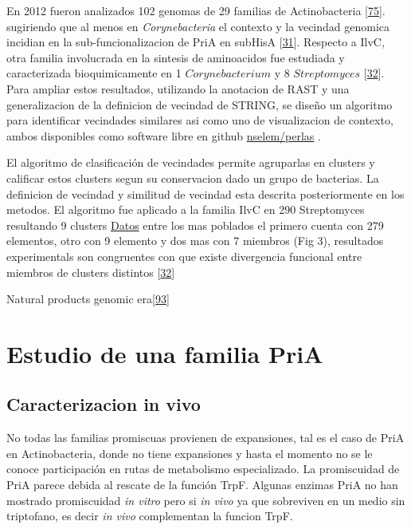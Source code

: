 \documentclass[12pt,twoside]{reedthesis}
\begin{document}
  En 2012 fueron analizados 102 genomas de 29 familias de Actinobacteria
  {[}\protect\hyperlink{ref-noda_tesis_2012}{75}{]}. sugiriendo que al
  menos en \emph{Corynebacteria} el contexto y la vecindad genomica
  incidian en la sub-funcionalizacion de PriA en subHisA
  {[}\protect\hyperlink{ref-noda-garcia_evolution_2013}{31}{]}. Respecto a
  IlvC, otra familia involucrada en la sintesis de aminoacidos fue
  estudiada y caracterizada bioquimicamente en 1 \(Corynebacterium\) y 8
  \(Streptomyces\)
  {[}\protect\hyperlink{ref-verdel-aranda_molecular_2015}{32}{]}. Para
  ampliar estos resultados, utilizando la anotacion de RAST y una
  generalizacion de la definicion de vecindad de STRING, se diseño un
  algoritmo para identificar vecindades similares asi como uno de
  visualizacion de contexto, ambos disponibles como software libre en
  github \href{https://github.com/nselem/perlas}{nselem/perlas} .
  
  El algoritmo de clasificación de vecindades permite agruparlas en
  clusters y calificar estos clusters segun su conservacion dado un grupo
  de bacterias. La definicion de vecindad y similitud de vecindad esta
  descrita posteriormente en los metodos. El algoritmo fue aplicado a la
  familia IlvC en 290 Streptomyces resultando 9 clusters
  \href{http://148.247.230.43/nselem/CONTEXTS/REL_St275/ilvC/Contextos.php}{Datos}
  entre los mas poblados el primero cuenta con 279 elementos, otro con 9
  elemento y dos mas con 7 miembros (Fig 3), resultados experimentals son
  congruentes con que existe divergencia funcional entre miembros de
  clusters distintos
  {[}\protect\hyperlink{ref-verdel-aranda_molecular_2015}{32}{]}
  
  Natural products genomic
  era{[}\protect\hyperlink{ref-harvey_re-emergence_2015}{93}{]}
  
  \section{Estudio de una familia PriA}\label{estudio-de-una-familia-pria}
  
  \subsection{Caracterizacion in vivo}\label{caracterizacion-in-vivo}
  
  No todas las familias promiscuas provienen de expansiones, tal es el
  caso de PriA en Actinobacteria, donde no tiene expansiones y hasta el
  momento no se le conoce participación en rutas de metabolismo
  especializado. La promiscuidad de PriA parece debida al rescate de la
  función TrpF. Algunas enzimas PriA no han mostrado promiscuidad \emph{in
  vitro} pero si \emph{in vivo} ya que sobreviven en un medio sin
  triptofano, es decir \emph{in vivo} complementan la funcion TrpF.
  
\end{document}
